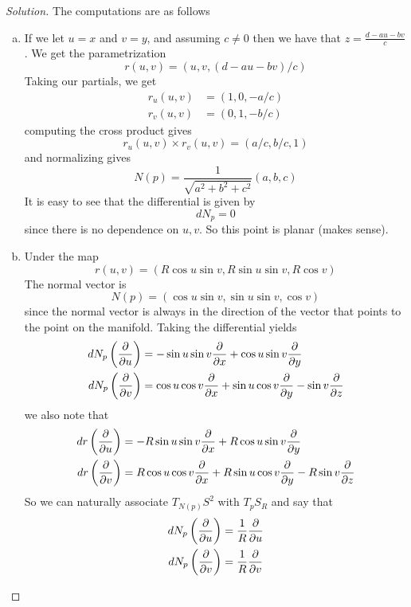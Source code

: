 \documentclass[a4paper]{article}
\begin{document}
\begin{proof}[Solution]
  The computations are as follows  
  \begin{enumerate}[(a)]
    \item If we let $u = x$ and $v = y$, and assuming $c \neq 0$ then we have that $z = \frac{d - au - bv}{c}$. We get the parametrization
      \[
        r(u,v) = (u, v, (d - au - bv)/c)
      \]
      Taking our partials, we get
      \[
        \begin{aligned}
          r_u(u,v) &= (1, 0, -a/c) \\
          r_v(u,v) &= (0, 1, -b/c)
        \end{aligned}
      \]
      computing the cross product gives
      \[
        r_u(u,v) \times r_v(u,v) = (a/c, b/c, 1)
      \]
      and normalizing gives
      \[
        N(p) = \frac{1}{\sqrt{a^2 + b^2 + c^2}} (a, b, c)
      \]
      It is easy to see that the differential is given by
      \[
        dN_p = 0
      \]
      since there is no dependence on $u,v$. So this point is planar (makes sense).
    \item Under the map
      \[
        r(u,v) = (R \cos u \sin v, R \sin u \sin v, R \cos v)
      \]
      The normal vector is
      \[
        N(p) = (\cos u \sin v, \sin u \sin v, \cos v)
      \]
      since the normal vector is always in the direction of the vector that points to the point on the manifold. Taking the differential yields
      \[
        \begin{aligned}
          dN_p \left( \pdv{u} \right) &= -\sin u \sin v \pdv{x} +  \cos u \sin v \pdv{y} \\
          dN_p \left( \pdv{v} \right) &= \cos u \cos v \pdv{x} + \sin u \cos v \pdv{y} - \sin v \pdv{z}  \\
        \end{aligned}
      \]
      we also note that 
      \[
        \begin{aligned}
          dr \left( \pdv{u} \right) &= -R\sin u \sin v \pdv{x} +  R\cos u \sin v \pdv{y} \\
          dr \left( \pdv{v} \right) &= R\cos u \cos v \pdv{x} + R\sin u \cos v \pdv{y} - R\sin v \pdv{z}  \\
        \end{aligned}
      \]
      So we can naturally associate $T_{N(p)}S^2$ with $T_pS_R$ and say that
      \[
        \begin{aligned}
          dN_p \left( \pdv{u} \right) &= \frac{1}{R} \pdv{u} \\
          dN_p \left( \pdv{v} \right) &= \frac{1}{R} \pdv{v}

\end{aligned}\]
\end{enumerate}
\end{proof}
\end{document}
